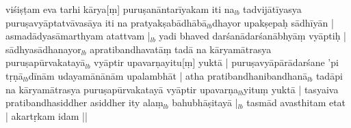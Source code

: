 \documentclass[article,12pt,a4paper]{memoir}%
\newcounter{parCount}
\begin{document}
	  
	  \pstart \leavevmode%
	viśiṣṭam eva tarhi kārya[ṃ] puruṣanāntarīyakam iti na{\tiny $_{lb}$} tadvijātīyasya puruṣavyāptatvāvasāya iti na pratyakṣabādhābā{\tiny $_{lb}$}dhayor upakṣepaḥ sādhīyān | asmadādyasāmarthyam atattvam |{\tiny $_{lb}$} yadi bhaved darśanādarśanābhyāṃ vyāptiḥ | sādhyasādhanayor{\tiny $_{lb}$} apratibandhavatāṃ tadā na kāryamātrasya puruṣapūrvakatayā{\tiny $_{lb}$} vyāptir upavarṇayitu[ṃ] yuktā | puruṣavyāpārādarśane 'pi tṛṇā{\tiny $_{lb}$}dīnām udayamānānām upalambhāt | atha pratibandhanibandhanā{\tiny $_{lb}$} tadāpi na kāryamātrasya puruṣapūrvakatayā vyāptir upavarṇa{\tiny $_{lb}$}yituṃ yuktā | tasyaiva pratibandhasiddher asiddher ity alaṃ{\tiny $_{lb}$} bahubhāṣitayā |{\tiny $_{lb}$} tasmād avasthitam etat | akartṛkam idam ||
	{}
	\pend%
      
	    
	    \endnumbering%
	    
     \backmatter 
\end{document}
